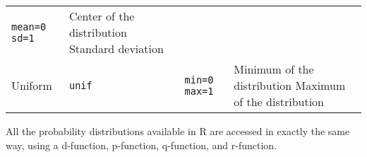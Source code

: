 \documentclass[]{book}
\begin{document}
\begin{longtable}[]{@{}llll@{}}
\begin{minipage}[t]{0.17\columnwidth}
\texttt{mean=0} \texttt{sd=1}\strut
\end{minipage} & \begin{minipage}[t]{0.40\columnwidth}\raggedright\strut
Center of the distribution Standard deviation\strut
\end{minipage}\tabularnewline
\begin{minipage}[t]{0.16\columnwidth}\raggedright\strut
Uniform\strut
\end{minipage} & \begin{minipage}[t]{0.15\columnwidth}\raggedright\strut
\texttt{unif}\strut
\end{minipage} & \begin{minipage}[t]{0.17\columnwidth}\raggedright\strut
\texttt{min=0} \texttt{max=1}\strut
\end{minipage} & \begin{minipage}[t]{0.40\columnwidth}\raggedright\strut
Minimum of the distribution Maximum of the distribution\strut
\end{minipage}\tabularnewline
\bottomrule
\end{longtable}

All the probability distributions available in R are accessed in exactly
the same way, using a d-function, p-function, q-function, and
r-function.
\end{document}
